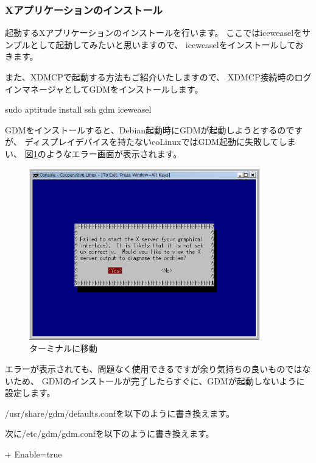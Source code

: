 \documentclass[mingoth,a4paper]{jsarticle}
\begin{document}
\subsubsection{Xアプリケーションのインストール}
起動するXアプリケーションのインストールを行います。
ここではiceweaselをサンプルとして起動してみたいと思いますので、
iceweaselをインストールしておきます。

また、XDMCPで起動する方法もご紹介いたしますので、
XDMCP接続時のログインマネージャとしてGDMをインストールします。

\begin{commandline}
sudo aptitude install ssh gdm iceweasel
\end{commandline}

GDMをインストールすると、Debian起動時にGDMが起動しようとするのですが、
ディスプレイデバイスを持たないcoLinuxではGDM起動に失敗してしまい、
図\ref{fig:colinux_gdmerror}のようなエラー画面が表示されます。

\begin{figure}[htbp]
 \begin{center}
  \includegraphics[width=100mm]{image200808/colinux_gdmerror.png}
 \end{center}
 \caption{ターミナルに移動}
 \label{fig:colinux_gdmerror}
\end{figure}

エラーが表示されても、問題なく使用できるですが余り気持ちの良いものではないため、
GDMのインストールが完了したらすぐに、GDMが起動しないように設定します。

/usr/share/gdm/defaults.confを以下のように書き換えます。

次に/etc/gdm/gdm.confを以下のように書き換えます。
\begin{commandline}
   [xdmcp]
+  Enable=true
\end{commandline}
\end{document}
